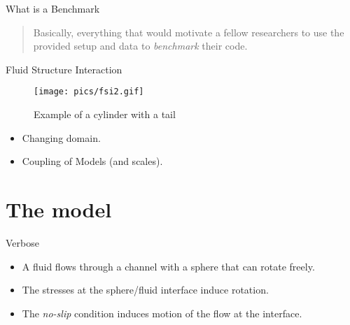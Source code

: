 \begin{frame}{What is a Benchmark}

\begin{quote}
Basically, everything that would motivate a fellow researchers to use
the provided setup and data to \emph{benchmark} their code.
\end{quote}

\end{frame}

\begin{frame}{Fluid Structure Interaction}

\begin{figure}
\centering
\texttt{[image: pics/fsi2.gif]}
\caption{Example of a cylinder with a tail}
\end{figure}

\begin{itemize}
\tightlist
\item
  Changing domain.
\item
  Coupling of Models (and scales).
\end{itemize}

\end{frame}

\section{The model}\label{the-model}

\begin{frame}{Verbose}

\begin{itemize}
\tightlist
\item
  A fluid flows through a channel with a sphere that can rotate freely.
\item
  The stresses at the sphere/fluid interface induce rotation.
\item
  The \emph{no-slip} condition induces motion of the flow at the
  interface.
\end{itemize}

\end{frame}

